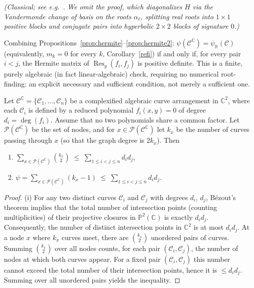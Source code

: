 \documentclass[article,11pt]{amsart} \numberwithin{equation}{section}
\numberwithin{equation}{section}
\begin{document}
{\emph{(Classical; see e.g.\ \cite[Thm.\ 4.57]{BasuPollackRoy}. We omit
	the proof, which diagonalizes $H$ via the Vandermonde change of basis on
	the roots $\alpha_\ell$, splitting real roots into $1\times1$ positive
	blocks and conjugate pairs into hyperbolic $2\times2$ blocks of signature
	$0$.)}

\begin{rk}
	\label{rem:global}
	Combining Propositions~\ref{prop:hermite}--\ref{prop:hermite2}:
	$\psi(\mathcal C^\mathbb C)=\psi_\mathbb R(\mathcal C)$ (equivalently, $m_k=0$ for every
	$k$, Corollary~\ref{refi}) if and only if, for every pair
	$i<j$, the Hermite matrix of $\operatorname{Res}_y(f_i,f_j)$ is positive definite. This
	is a finite, purely algebraic (in fact linear-algebraic) check, requiring
	no numerical root-finding: an explicit necessary and sufficient condition,
	not merely a sufficient one.
\end{rk}

\begin{inp}\label{inp5.2}
	Let $\mathcal{C}^\mathbb{C} = \{\mathscr{C}_1,\dots,\mathscr{C}_n\}$ be a complexified algebraic curve arrangement in $\mathbb{C}^2$, where each $\mathscr{C}_i$ is defined by a reduced polynomial $f_i(x,y)=0$ of degree $d_i = \deg(f_i)$. Assume that no two polynomials share a common factor. Let $\mathcal{P}(\mathcal{C}^\mathbb{C})$ be the set of nodes, and for $x \in \mathcal{P}(\mathcal{C}^\mathbb{C})$ let $k_x$ be the number of curves passing through $x$ (so that the graph degree is $2k_x$). Then
	\begin{enumerate}
		\item[(i)] $\displaystyle\sum_{x\in\mathcal{P}(\mathcal{C}^\mathbb{C})}\binom{k_x}{2} \;\le\; \sum_{1\le i<j\le n} d_i d_j$,
		\item[(ii)] $\displaystyle\psi = \sum_{x\in\mathcal{P}(\mathcal{C}^\mathbb{C})}(k_x-1) \;\le\; \sum_{1\le i<j\le n} d_i d_j$.
	\end{enumerate}
\end{inp}

\begin{proof}
	(i) For any two distinct curves $\mathscr{C}_i$ and $\mathscr{C}_j$ with degrees $d_i$, $d_j$, B\'ezout's theorem implies that the total number of intersection points (counting multiplicities) of their projective closures in $\mathbb{P}^2(\mathbb{C})$ is exactly $d_i d_j$. Consequently, the number of distinct intersection points in $\mathbb{C}^2$ is at most $d_i d_j$.  
	At a node $x$ where $k_x$ curves meet, there are $\binom{k_x}{2}$ unordered pairs of curves. Summing $\binom{k_x}{2}$ over all nodes counts, for each pair $(\mathscr{C}_i,\mathscr{C}_j)$, the number of nodes at which both curves appear. For a fixed pair $(\mathscr{C}_i,\mathscr{C}_j)$ this number cannot exceed the total number of their intersection points, hence it is $\le d_i d_j$. Summing over all unordered pairs yields the inequality.
	

\end{proof}}
\end{document}
